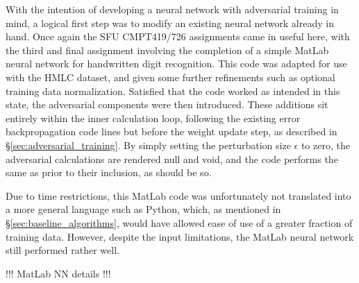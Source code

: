 \documentclass{article} %
\begin{document}
With the intention of developing a neural network with adversarial training in mind, a logical first step was to modify an existing neural network already in hand. Once again the SFU CMPT419/726 assignments came in useful here, with the third and final assignment involving the completion of a simple MatLab neural network for handwritten digit recognition. This code was adapted for use with the HMLC dataset, and given some further refinements such as optional training data normalization. Satisfied that the code worked as intended in this state, the adversarial components were then introduced. These additions sit entirely within the inner calculation loop, following the existing error backpropagation code lines but before the weight update step, as described in \S\ref{sec:adversarial_training}. By simply setting the perturbation size $\epsilon$ to zero, the adversarial calculations are rendered null and void, and the code performs the same as prior to their inclusion, as should be so.

Due to time restrictions, this MatLab code was unfortunately not translated into a more general language such as Python, which, as mentioned in \S\ref{sec:baseline_algorithms}, would have allowed ease of use of a greater fraction of training data. However, despite the input limitations, the MatLab neural network still performed rather well.

!!! MatLab NN details !!!
\end{document}
